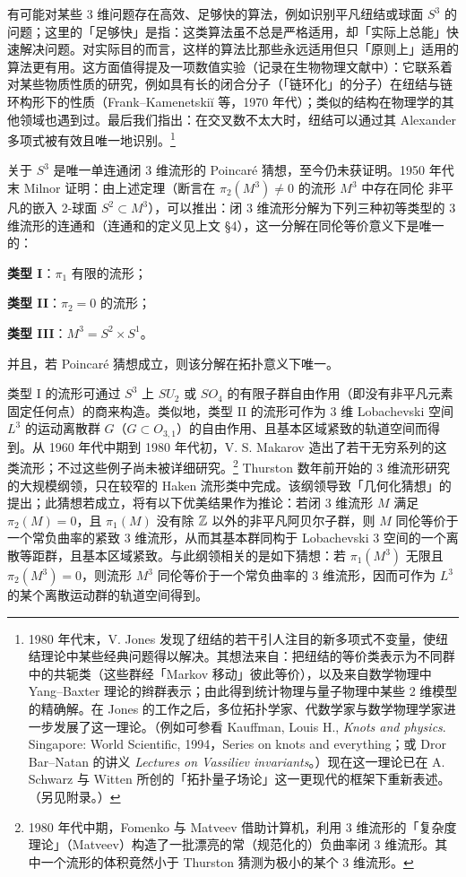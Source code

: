 有可能对某些 3 维问题存在高效、足够快的算法，例如识别平凡纽结或球面 $S^{3}$ 的问题；这里的「足够快」是指：这类算法虽不总是严格适用，却「实际上总能」快速解决问题。对实际目的而言，这样的算法比那些永远适用但只「原则上」适用的算法更有用。这方面值得提及一项数值实验（记录在生物物理文献中）：它联系着对某些物质性质的研究，例如具有长的闭合分子（「链环化」的分子）在纽结与链环构形下的性质（Frank--Kamenetskiĭ 等，1970 年代）；类似的结构在物理学的其他领域也遇到过。最后我们指出：在交叉数不太大时，纽结可以通过其 Alexander 多项式被有效且唯一地识别。\footnote{1980 年代末，V. Jones 发现了纽结的若干引人注目的新多项式不变量，使纽结理论中某些经典问题得以解决。其想法来自：把纽结的等价类表示为不同群中的共轭类（这些群经「Markov 移动」彼此等价），以及来自数学物理中 Yang--Baxter 理论的辫群表示；由此得到统计物理与量子物理中某些 2 维模型的精确解。在 Jones 的工作之后，多位拓扑学家、代数学家与数学物理学家进一步发展了这一理论。（例如可参看 Kauffman, Louis H., \emph{Knots and physics}. Singapore: World Scientific, 1994，Series on knots and everything；或 Dror Bar--Natan 的讲义 \emph{Lectures on Vassiliev invariants}。）现在这一理论已在 A. Schwarz 与 Witten 所创的「拓扑量子场论」这一更现代的框架下重新表述。（另见附录。）}

关于 $S^{3}$ 是唯一单连通闭 3 维流形的 Poincaré 猜想，至今仍未获证明。1950 年代末 Milnor 证明：由上述定理（断言在 $\pi_{2}(M^{3})\neq 0$ 的流形 $M^{3}$ 中存在同伦
非平凡的嵌入 2-球面 $S^{2}\subset M^{3}$），可以推出：闭 3 维流形分解为下列三种初等类型的 3 维流形的连通和（连通和的定义见上文 §4），这一分解在同伦等价意义下是唯一的：

\textbf{类型 I}：$\pi_{1}$ 有限的流形；

\textbf{类型 II}：$\pi_{2}=0$ 的流形；

\textbf{类型 III}：$M^{3}=S^{2}\times S^{1}$。

并且，若 Poincaré 猜想成立，则该分解在拓扑意义下唯一。

类型 I 的流形可通过 $S^{3}$ 上 $SU_{2}$ 或 $SO_{4}$ 的有限子群自由作用（即没有非平凡元素固定任何点）的商来构造。类似地，类型 II 的流形可作为 3 维 Lobachevski 空间 $L^{3}$ 的运动离散群 $G$（$G\subset O_{3,1}$）的自由作用、且基本区域紧致的轨道空间而得到。从 1960 年代中期到 1980 年代初，V. S. Makarov 造出了若干无穷系列的这类流形；不过这些例子尚未被详细研究。\footnote{1980 年代中期，Fomenko 与 Matveev 借助计算机，利用 3 维流形的「复杂度理论」（Matveev）构造了一批漂亮的常（规范化的）负曲率闭 3 维流形。其中一个流形的体积竟然小于 Thurston 猜测为极小的某个 3 维流形。} Thurston 数年前开始的 3 维流形研究的大规模纲领，只在较窄的 Haken 流形类中完成。该纲领导致「几何化猜想」的提出；此猜想若成立，将有以下优美结果作为推论：若闭 3 维流形 $M$ 满足 $\pi_{2}(M)=0$，且 $\pi_{1}(M)$ 没有除 $\mathbb{Z}$ 以外的非平凡阿贝尔子群，则 $M$ 同伦等价于一个常负曲率的紧致 3 维流形，从而其基本群同构于 Lobachevski 3 空间的一个离散等距群，且基本区域紧致。与此纲领相关的是如下猜想：若 $\pi_{1}(M^{3})$ 无限且 $\pi_{2}(M^{3})=0$，则流形 $M^{3}$ 同伦等价于一个常负曲率的 3 维流形，因而可作为 $L^{3}$ 的某个离散运动群的轨道空间得到。

